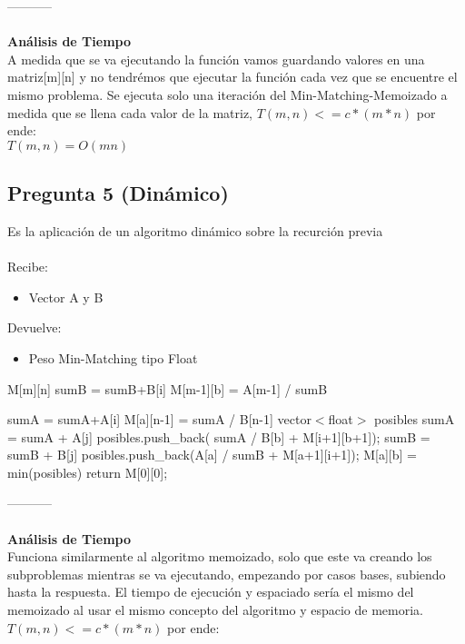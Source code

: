 \documentclass{article}
\newcommand{\TITLE}[1]{\item[#1]}
\newcommand{\algcost}[2]{\strut\hfill\makebox[1.5cm][l]{#1}\makebox[4cm][l]{#2}}
\begin{document}
-----------\\\\
\textbf{Análisis de Tiempo}\\
A medida que se va ejecutando la función vamos guardando valores en una matriz[m][n] y no tendrémos que ejecutar la función cada vez que se encuentre el mismo problema. Se ejecuta solo una iteración del Min-Matching-Memoizado a medida que se llena cada valor de la matriz, 
$T(m,n) <= c*(m*n)$ por ende:\\

$T(m,n) = O(mn)$

	\subsection*{Pregunta 5 (Dinámico)}
	Es la  aplicación de un algoritmo dinámico sobre la recurción previa\\\\
	Recibe:
	\begin{itemize}
		\item Vector A y B
	\end{itemize}
	Devuelve: 
	\begin{itemize}
		\item Peso Min-Matching tipo Float
	\end{itemize}
	\begin{algorithmic}[1]
		\TITLE{\textsc{Min-Matching-Dinámico}$(A, B)$}
		\STATE M[m][n] 
		\STATE sumB = sumB+B[i] 
		\ENDFOR
		\STATE M[m-1][b] =  A[m-1] / sumB  \algcost{$.$}{$.$}
		\ENDFOR
		\STATE sumA = sumA+A[i] 
		\ENDFOR
		\STATE M[a][n-1] =  sumA / B[n-1]  
		\ENDFOR
		\STATE vector$<$float$>$ posibles
		\STATE sumA = sumA + A[j]
		\ENDFOR 
		posibles.push\_back( sumA / B[b] + M[i+1][b+1]);
		\ENDFOR
		\STATE sumB = sumB + B[j]
		\ENDFOR 
		posibles.push\_back(A[a] / sumB + M[a+1][i+1]);
		\ENDFOR
		\ENDFOR
		\STATE M[a][b] = min(posibles)
		\ENDFOR
		\STATE return M[0][0];
	\end{algorithmic}
		
-----------\\\\
\textbf{Análisis de Tiempo}\\
Funciona similarmente al algoritmo memoizado, solo que este va creando los subproblemas mientras se va ejecutando, empezando por casos bases, subiendo hasta la respuesta. El tiempo de ejecución y espaciado sería el mismo del memoizado al usar el mismo concepto del algoritmo y espacio de memoria.
$T(m,n) <= c*(m*n)$ por ende:\\
\end{document}

